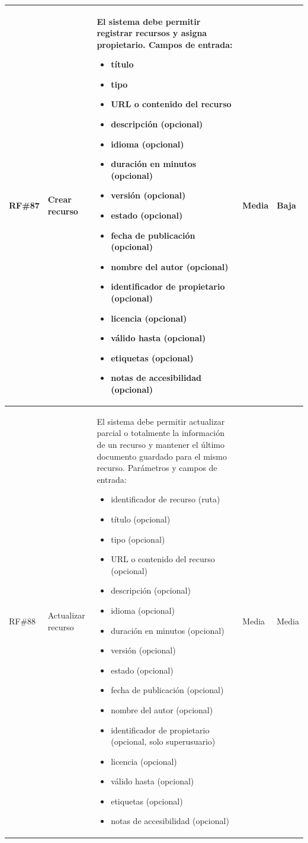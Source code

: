 \begin{longtable}{|p{1cm}|p{4cm}|p{5.2cm}|p{1.9cm}|p{1.9cm}|}
	\hline
	\rowcolor[HTML]{EDEBF1}
	\ac{RF}\#87 & Crear recurso & El sistema debe permitir registrar recursos y asigna propietario. Campos de entrada:
		\begin{itemize}
			\item título
			\item tipo
			\item URL o contenido del recurso
			\item descripción (opcional)
			\item idioma (opcional)
			\item duración en minutos (opcional)
			\item versión (opcional)
			\item estado (opcional)
			\item fecha de publicación (opcional)
			\item nombre del autor (opcional)
			\item identificador de propietario (opcional)
			\item licencia (opcional)
			\item válido hasta (opcional)
			\item etiquetas (opcional)
			\item notas de accesibilidad (opcional)
		\end{itemize}
	& Media & Baja \\
	\hline
	\ac{RF}\#88 & Actualizar recurso & El sistema debe permitir actualizar parcial o totalmente la información de un recurso y mantener el último documento guardado para el mismo recurso. Parámetros y campos de entrada:
		\begin{itemize}
			\item identificador de recurso (ruta)
			\item título (opcional)
			\item tipo (opcional)
			\item URL o contenido del recurso (opcional)
			\item descripción (opcional)
			\item idioma (opcional)
			\item duración en minutos (opcional)
			\item versión (opcional)
			\item estado (opcional)
			\item fecha de publicación (opcional)
			\item nombre del autor (opcional)
			\item identificador de propietario (opcional, solo superusuario)
			\item licencia (opcional)
			\item válido hasta (opcional)
			\item etiquetas (opcional)
			\item notas de accesibilidad (opcional)
		\end{itemize}
	& Media & Media \\
	\hline

\end{longtable}


